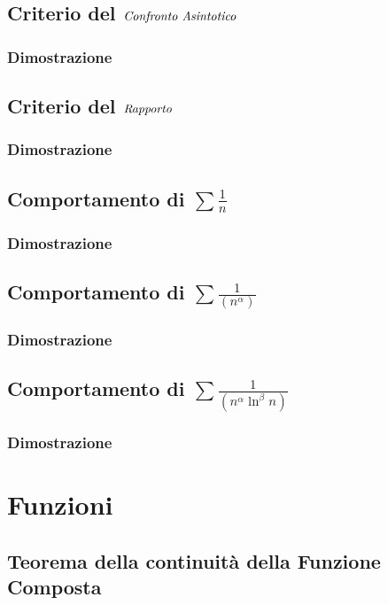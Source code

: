 \documentclass[11pt, a4paper]{article}
\begin{document}
\subsection{Criterio del $\emph{Confronto Asintotico}$}
\subsubsection*{Dimostrazione}


\subsection{Criterio del $\emph{Rapporto}$}
\subsubsection*{Dimostrazione}


\subsection{Comportamento di $\sum\frac{1}{n}$}
\subsubsection*{Dimostrazione}


\subsection{Comportamento di $\sum\frac{1}{(n^\alpha)}$}
\subsubsection*{Dimostrazione}


\subsection{Comportamento di $\sum\frac{1}{(n^\alpha\ln^\beta n)}$}
\subsubsection*{Dimostrazione}

\newpage

\section{Funzioni}
\subsection{Teorema della continuità della Funzione Composta}
\end{document}
